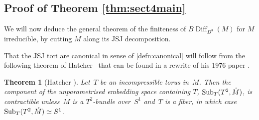 \documentclass{amsart}
\theoremstyle{plain}
\newtheorem{thm}{Theorem}[section]
\theoremstyle{definition}
\DeclareMathOperator\Diff{Diff}
\DeclareMathOperator{\umb}{Sub} %
\newcommand{\interior}[1]{\smash{\mathring{#1}}}
\newcommand{\BDiff}{B\!\Diff}
\begin{document}
 

\subsection{Proof of Theorem \ref{thm:sect4main}}

We will now deduce the general theorem of the finiteness of $\BDiff_{D^3}(M)$ for $M$ irreducible, by cutting $M$ along its JSJ decomposition.

That the JSJ tori are canonical in sense of \cref{defn:canonical} will follow from the following theorem of Hatcher~\cite{Hatcherincompressible} that can be found in a rewrite of his 1976 paper \cite{Hatcher76}.

\begin{thm}[Hatcher {\cite[Theorem 1(a)]{Hatcherincompressible}}]\label{thm:Hatcher-Incompressible}
    Let~$T$ be an incompressible torus in~$M$. Then the component of the unparametrised embedding space containing $T$, $\umb_{T}(T^2,\interior{M})$, is contractible unless~$M$ is a $T^2$-bundle over~$S^1$ and~$T$ is a fiber, in which case $\umb_T(T^2,\interior{M})\simeq S^1$.
\end{thm}
\end{document}
